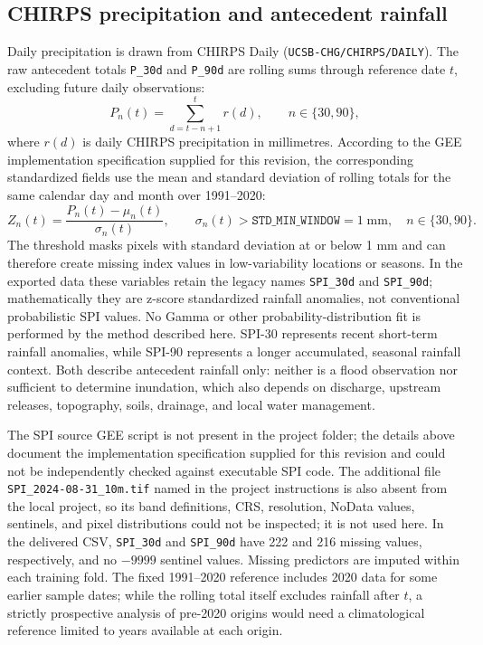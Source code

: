 \documentclass[pdflatex,sn-mathphys,Numbered]{sn-jnl}
\begin{document}
\subsection{CHIRPS precipitation and antecedent rainfall}
Daily precipitation is drawn from CHIRPS Daily (\texttt{UCSB-CHG/CHIRPS/DAILY}). The raw antecedent totals \texttt{P\_30d} and \texttt{P\_90d} are rolling sums through reference date $t$, excluding future daily observations:
\begin{equation}
P_n(t)=\sum_{d=t-n+1}^{t}r(d),\qquad n\in\{30,90\},
\end{equation}
where $r(d)$ is daily CHIRPS precipitation in millimetres. According to the GEE implementation specification supplied for this revision, the corresponding standardized fields use the mean and standard deviation of rolling totals for the same calendar day and month over 1991--2020:
\begin{equation}
Z_n(t)=\frac{P_n(t)-\mu_n(t)}{\sigma_n(t)},\qquad
\sigma_n(t)>\texttt{STD\_MIN\_WINDOW}=1\;\mathrm{mm},
\quad n\in\{30,90\}.
\end{equation}
The threshold masks pixels with standard deviation at or below 1 mm and can therefore create missing index values in low-variability locations or seasons. In the exported data these variables retain the legacy names \texttt{SPI\_30d} and \texttt{SPI\_90d}; mathematically they are z-score standardized rainfall anomalies, not conventional probabilistic SPI values. No Gamma or other probability-distribution fit is performed by the method described here. SPI-30 represents recent short-term rainfall anomalies, while SPI-90 represents a longer accumulated, seasonal rainfall context. Both describe antecedent rainfall only: neither is a flood observation nor sufficient to determine inundation, which also depends on discharge, upstream releases, topography, soils, drainage, and local water management.

The SPI source GEE script is not present in the project folder; the details above document the implementation specification supplied for this revision and could not be independently checked against executable SPI code. The additional file \texttt{SPI\_2024-08-31\_10m.tif} named in the project instructions is also absent from the local project, so its band definitions, CRS, resolution, NoData values, sentinels, and pixel distributions could not be inspected; it is not used here. In the delivered CSV, \texttt{SPI\_30d} and \texttt{SPI\_90d} have 222 and 216 missing values, respectively, and no $-9999$ sentinel values. Missing predictors are imputed within each training fold. The fixed 1991--2020 reference includes 2020 data for some earlier sample dates; while the rolling total itself excludes rainfall after $t$, a strictly prospective analysis of pre-2020 origins would need a climatological reference limited to years available at each origin.
\end{document}

